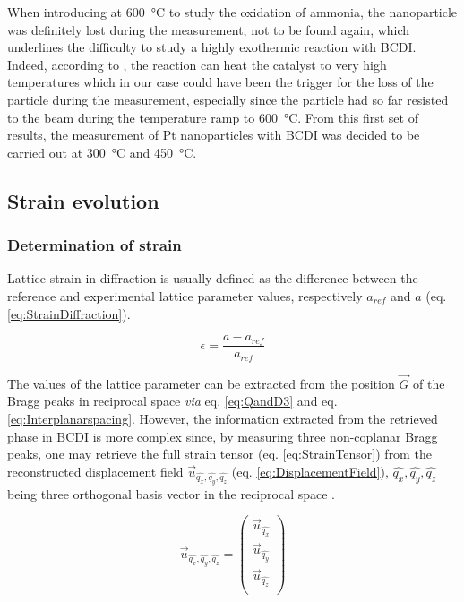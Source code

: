 When introducing \dioxygen at \qty{600}{\degreeCelsius} to study the oxidation of ammonia, the nanoparticle was definitely lost during the measurement, not to be found again, which underlines the difficulty to study a highly exothermic reaction with BCDI.
Indeed, according to \cite{}, the reaction can heat the catalyst to very high temperatures which in our case could have been the trigger for the loss of the particle during the measurement, especially since the particle had so far resisted to the beam during the temperature ramp to \qty{600}{\degreeCelsius}.
From this first set of results, the measurement of Pt nanoparticles with BCDI was decided to be carried out at \qty{300}{\degreeCelsius} and \qty{450}{\degreeCelsius}.

\subsection{Strain evolution} \label{sec:StrainTempRamp}

\subsubsection{Determination of strain}

Lattice strain in diffraction is usually defined as the difference between the  reference and experimental lattice parameter values, respectively $a_{ref}$ and $a$ (eq. \ref{eq:StrainDiffraction}).

\begin{equation}
    \epsilon = \frac{a - a_{ref}}{a_{ref}}
    \label{eq:StrainDiffraction}
\end{equation}

The values of the lattice parameter can be extracted from the position $\vec{G}$ of the Bragg peaks in reciprocal space \textit{via} eq. \ref{eq:QandD3} and eq. \ref{eq:Interplanarspacing}.
However, the information extracted from the retrieved phase in BCDI is more complex since, by measuring three non-coplanar Bragg peaks, one may retrieve the full strain tensor (eq. \ref{eq:StrainTensor}) from the reconstructed displacement field $\vec{u}_{\hat{q_x}, \hat{q_y}, \hat{q_z}}$ (eq. \ref{eq:DisplacementField}), $\hat{q_x}, \hat{q_y}, \hat{q_z}$ being three orthogonal basis vector in the reciprocal space \parencite{Karpov2019}.

\begin{equation}
    \vec{u}_{\hat{q_x}, \hat{q_y}, \hat{q_z}} =
     \begin{pmatrix}
        \vec{u}_{\hat{q_x}} \\
        \vec{u}_{\hat{q_y}} \\
        \vec{u}_{\hat{q_z}} \\
     \end{pmatrix}
     \label{eq:DisplacementField}
\end{equation}

